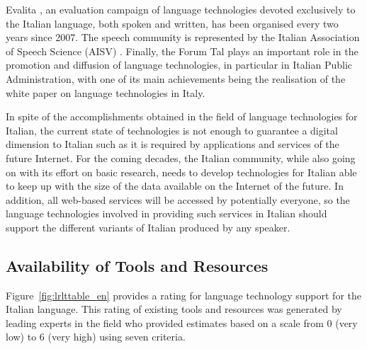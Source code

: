 \begin{multicols}{2}
Evalita \cite{evalita}, an evaluation campaign of language technologies devoted exclusively to the Italian language, both spoken and written, has been organised every two years since 2007. The speech community is represented by the Italian Association of Speech Science (AISV) \cite{aisv}. Finally, the Forum Tal \cite{forumtal} plays an important role in the promotion and diffusion of language technologies, in particular in Italian Public Administration, with one of its main achievements being the realisation of the white paper on language technologies in Italy.

In spite of the accomplishments obtained in the field of language technologies for Italian, the current state of technologies is not enough to guarantee a digital dimension to Italian such as it is required by applications and services of the future Internet. For the coming decades, the Italian community, while also going on with its effort on basic research, needs to develop technologies for Italian able to keep up with the size of the data available on the Internet of the future. In addition, all web-based services will be accessed by potentially everyone, so the language technologies involved in providing such services in Italian should support the different variants of Italian produced by any speaker.
 
\subsection{Availability of Tools and Resources}

Figure~\ref{fig:lrlttable_en} provides a rating for language technology support for the Italian language. This rating of existing tools and resources was generated by leading experts in the field who provided estimates based on a scale from 0 (very low) to 6 (very high) using seven criteria.


\end{multicols}
